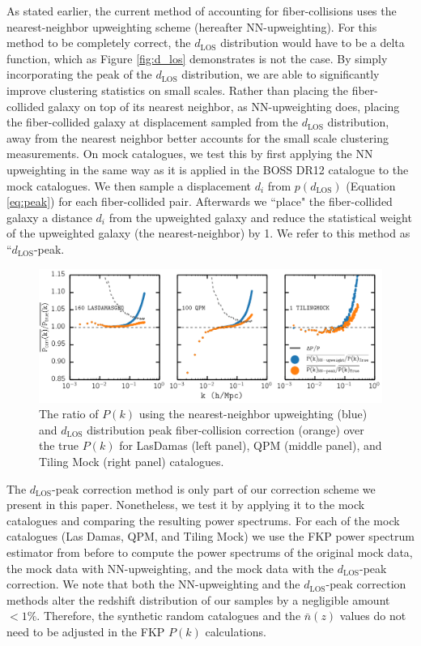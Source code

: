 \documentclass{emulateapj}
\begin{document}
As stated earlier, the current method of accounting for fiber-collisions uses the nearest-neighbor upweighting scheme (hereafter NN-upweighting). For this method to be completely correct, the $d_{\mathrm{LOS}}$ distribution would have to be a delta function, which as Figure \ref{fig:d_los} demonstrates is not the case. By simply incorporating the peak of the $d_{\mathrm{LOS}}$ distribution, we are able to significantly improve clustering statistics on small scales. Rather than placing the fiber-collided galaxy on top of its nearest neighbor, as NN-upweighting does, placing the fiber-collided galaxy at displacement sampled from the $d_{\mathrm{LOS}}$ distribution, away from the nearest neighbor better accounts for the small scale clustering measurements. On mock catalogues, we test this by first applying the NN upweighting in the same way as it is applied in the BOSS DR12 catalogue to the mock catalogues. We then sample a displacement $d_i$ from $p(d_\mathrm{LOS})$ (Equation \ref{eq:peak}) for each fiber-collided pair. Afterwards we ``place" the fiber-collided galaxy a distance $d_i$ from the upweighted galaxy and reduce the statistical weight of the upweighted galaxy (the nearest-neighbor) by 1. We refer to this method as ``$d_\mathrm{LOS}$-peak. 

\begin{figure}
\begin{center}
\includegraphics[scale=0.55]{fcpaper_pk_peakonly_comp.png} 
\caption{The ratio of $P(k)$ using the nearest-neighbor upweighting (blue) and $d_\mathrm{LOS}$ distribution peak fiber-collision correction (orange) over the true $P(k)$ for LasDamas (left panel), QPM (middle panel), and Tiling Mock (right panel) catalogues. }\label{fig:peakonly}
\end{center}
\end{figure}

The $d_\mathrm{LOS}$-peak correction method is only part of our correction scheme we present in this paper. Nonetheless, we test it by applying it to the mock catalogues and comparing the resulting power spectrums. For each of the mock catalogues (Las Damas, QPM, and Tiling Mock) we use the FKP power spectrum estimator from before to compute the power spectrums of the original mock data, the mock data with NN-upweighting, and the mock data with the $d_\mathrm{LOS}$-peak correction. We note that both the NN-upweighting and the $d_\mathrm{LOS}$-peak correction methods alter the redshift distribution of our samples by a negligible amount $< 1\%$. Therefore, the synthetic random catalogues and the $\bar{n}(z)$ values do not need to be adjusted in the FKP $P(k)$ calculations.
\end{document}
